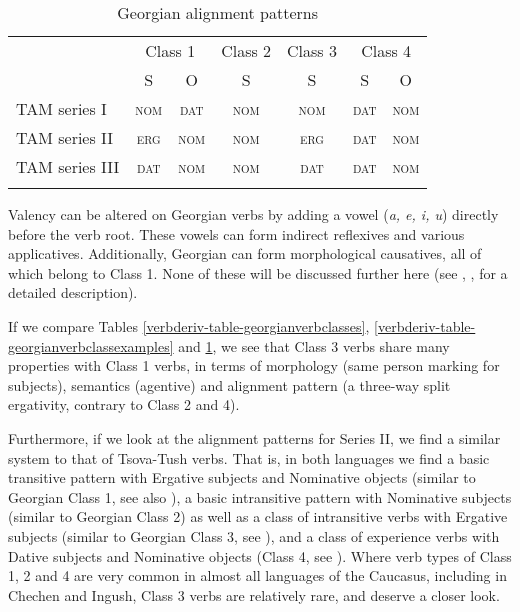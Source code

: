\begin{table}
	\begin{tabular}{lcccccc}
		\lsptoprule
		& \multicolumn{2}{c}{{Class 1}} & {Class 2} & {Class 3} & \multicolumn{2}{c}{{Class 4}}\\\cmidrule(lr){2-3}\cmidrule(lr){4-5}\cmidrule(lr){6-7}
		& S & O & S & S & S & O \\
		\midrule
		TAM series I & \textsc{nom}  & \textsc{dat} & \textsc{nom} & \textsc{nom} & \textsc{dat} & \textsc{nom} \\
		TAM series II & \textsc{erg} & \textsc{nom} & \textsc{nom} & \textsc{erg} & \textsc{dat} & \textsc{nom} \\
		TAM series III & \textsc{dat} & \textsc{nom} & \textsc{nom} & \textsc{dat} & \textsc{dat} & \textsc{nom} \\
		\lspbottomrule
	\end{tabular}
	\caption{Georgian alignment patterns}
	\label{verbderiv-table-georgianalignment}
\end{table}

Valency can be altered on Georgian verbs by adding a vowel (\textit{a, e, i, u}) directly before the verb root. These vowels can form indirect reflexives and various applicatives. Additionally, Georgian can form morphological causatives, all of which belong to Class 1. None of these will be discussed further here (see \cites[118--162]{vogt}, \cites[]{gerardin2022valencegeo}, \cites[170--204]{hewitt95} for a detailed description).


If we compare Tables \ref{verbderiv-table-georgianverbclasses}, \ref{verbderiv-table-georgianverbclassexamples} and \ref{verbderiv-table-georgianalignment}, we see that Class 3 verbs share many properties with Class 1 verbs, in terms of morphology (same person marking for subjects), semantics (agentive) and alignment pattern (a three-way split ergativity, contrary to Class 2 and 4). 

Furthermore, if we look at the alignment patterns for Series II, we find a similar system to that of Tsova-Tush verbs. That is, in both languages we find a basic transitive pattern with Ergative subjects and Nominative objects (similar to Georgian Class 1, see also ), a basic intransitive pattern with Nominative subjects (similar to Georgian Class 2) as well as a class of intransitive verbs with Ergative subjects (similar to Georgian Class 3, see ), and a class of experience verbs with Dative subjects and Nominative objects (Class 4, see ). Where verb types of Class 1, 2 and 4 are very common in almost all languages of the Caucasus, including in Chechen and Ingush, Class 3 verbs are relatively rare, and deserve a closer look.

